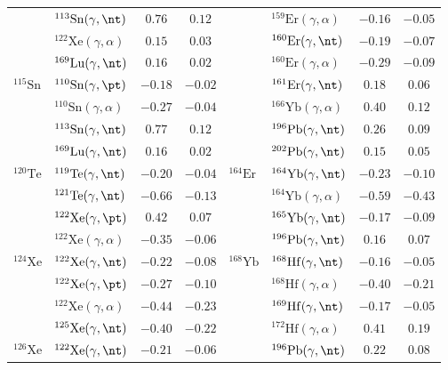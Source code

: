 {\begin{longtable}{llcc llcc}
$ $ & $^{113}\mathrm{Sn}(\gamma,\nt)$ & $0.76$ & $0.12$ & $ $ & $^{159}\mathrm{Er}(\gamma,\alpha)$ & $-0.16$ & $-0.05$ \\ 
$ $ & $^{122}\mathrm{Xe}(\gamma,\alpha)$ & $0.15$ & $0.03$ & $ $ & $^{160}\mathrm{Er}(\gamma,\nt)$ & $-0.19$ & $-0.07$ \\ 
$ $ & $^{169}\mathrm{Lu}(\gamma,\nt)$ & $0.16$ & $0.02$ & $ $ & $^{160}\mathrm{Er}(\gamma,\alpha)$ & $-0.29$ & $-0.09$ \\ 
$^{115}\mathrm{Sn}$ & $^{110}\mathrm{Sn}(\gamma,\pt)$ & $-0.18$ & $-0.02$ & $ $ & $^{161}\mathrm{Er}(\gamma,\nt)$ & $0.18$ & $0.06$ \\ 
$ $ & $^{110}\mathrm{Sn}(\gamma,\alpha)$ & $-0.27$ & $-0.04$ & $ $ & $^{166}\mathrm{Yb}(\gamma,\alpha)$ & $0.40$ & $0.12$ \\ 
$ $ & $^{113}\mathrm{Sn}(\gamma,\nt)$ & $0.77$ & $0.12$ & $ $ & $^{196}\mathrm{Pb}(\gamma,\nt)$ & $0.26$ & $0.09$ \\ 
$ $ & $^{169}\mathrm{Lu}(\gamma,\nt)$ & $0.16$ & $0.02$ & $ $ & $^{202}\mathrm{Pb}(\gamma,\nt)$ & $0.15$ & $0.05$ \\ 
$^{120}\mathrm{Te}$ & $^{119}\mathrm{Te}(\gamma,\nt)$ & $-0.20$ & $-0.04$ & $^{164}\mathrm{Er}$ & $^{164}\mathrm{Yb}(\gamma,\nt)$ & $-0.23$ & $-0.10$ \\ 
$ $ & $^{121}\mathrm{Te}(\gamma,\nt)$ & $-0.66$ & $-0.13$ & $ $ & $^{164}\mathrm{Yb}(\gamma,\alpha)$ & $-0.59$ & $-0.43$ \\ 
$ $ & $^{122}\mathrm{Xe}(\gamma,\pt)$ & $0.42$ & $0.07$ & $ $ & $^{165}\mathrm{Yb}(\gamma,\nt)$ & $-0.17$ & $-0.09$ \\ 
$ $ & $^{122}\mathrm{Xe}(\gamma,\alpha)$ & $-0.35$ & $-0.06$ & $ $ & $^{196}\mathrm{Pb}(\gamma,\nt)$ & $0.16$ & $0.07$ \\ 
$^{124}\mathrm{Xe}$ & $^{122}\mathrm{Xe}(\gamma,\nt)$ & $-0.22$ & $-0.08$ & $^{168}\mathrm{Yb}$ & $^{168}\mathrm{Hf}(\gamma,\nt)$ & $-0.16$ & $-0.05$ \\ 
$ $ & $^{122}\mathrm{Xe}(\gamma,\pt)$ & $-0.27$ & $-0.10$ & $ $ & $^{168}\mathrm{Hf}(\gamma,\alpha)$ & $-0.40$ & $-0.21$ \\ 
$ $ & $^{122}\mathrm{Xe}(\gamma,\alpha)$ & $-0.44$ & $-0.23$ & $ $ & $^{169}\mathrm{Hf}(\gamma,\nt)$ & $-0.17$ & $-0.05$ \\ 
$ $ & $^{125}\mathrm{Xe}(\gamma,\nt)$ & $-0.40$ & $-0.22$ & $ $ & $^{172}\mathrm{Hf}(\gamma,\alpha)$ & $0.41$ & $0.19$ \\ 
$^{126}\mathrm{Xe}$ & $^{122}\mathrm{Xe}(\gamma,\nt)$ & $-0.21$ & $-0.06$ & $ $ & $^{196}\mathrm{Pb}(\gamma,\nt)$ & $0.22$ & $0.08$ \\ 

\end{longtable}}
